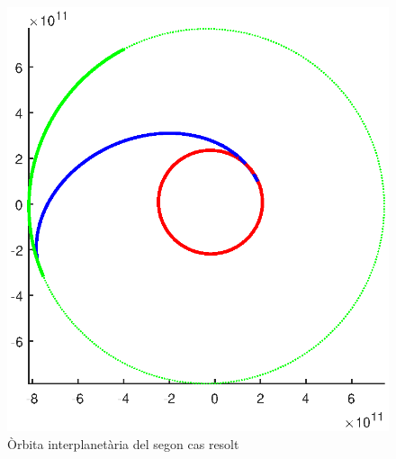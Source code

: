 \begin{figure}[H]
	\centering
	\includegraphics[scale=0.8]{./plots/ex2}
	\caption{Òrbita interplanetària del segon cas resolt}
\end{figure}


